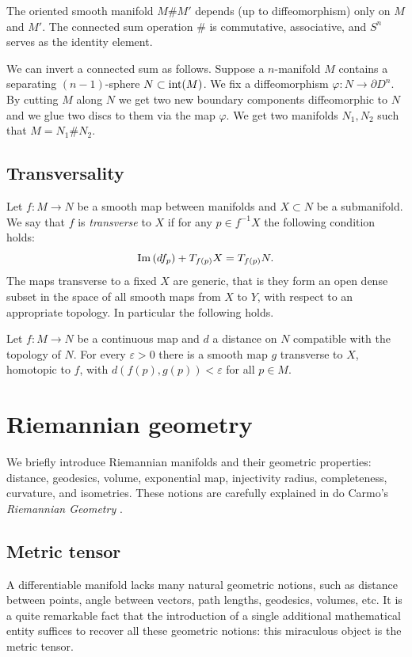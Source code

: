 \begin{prop}
The oriented smooth manifold $M\# M'$ depends (up to diffeomorphism) only on $M$ and $M'$. The connected sum operation $\#$ is commutative, associative, and $S^n$ serves as the identity element.
\end{prop}

We can invert a connected sum as follows. Suppose a $n$-manifold $M$ contains a separating $(n-1)$-sphere $N\subset {\rm int}(M)$. We fix a diffeomorphism $\varphi\colon N \to \partial D^n$. By cutting $M$ along $N$ we get two new boundary components diffeomorphic to $N$ and we glue two discs to them via the map $\varphi$. We get two manifolds $N_1, N_2$ such that $M=N_1\# N_2$.

\subsection{Transversality}
Let $f\colon M \to N$ be a smooth map between manifolds and $X\subset N$ be a submanifold. We say that $f$ is \emph{transverse} to $X$ if for any $p\in f^{-1}X$ the following condition holds:
$${\rm Im\,} (d f_p) + T_{f(p)}X = T_{f(p)}N.$$
The maps transverse to a fixed $X$ are generic, that is they form an open dense subset in the space of all smooth maps from $X$ to $Y$, with respect to an appropriate topology. In particular the following holds.
\begin{teo}
Let $f\colon M \to N$ be a continuous map and $d$ a distance on $N$ compatible with the topology of $N$. For every $\varepsilon >0$ there is a smooth map $g$ transverse to $X$, homotopic to $f$, with $d(f(p), g(p))<\varepsilon$ for all $p\in M$.
\end{teo}

\section{Riemannian geometry}

We briefly introduce Riemannian manifolds and their geometric properties: distance, geodesics, volume, exponential map, injectivity radius, completeness, curvature, and isometries. These notions are carefully explained in do Carmo's \emph{Riemannian Geometry} \cite{Do}.

\subsection{Metric tensor}
A differentiable manifold lacks many natural geometric notions, such as distance between points, angle between vectors, path lengths, geodesics, volumes, etc. It is a quite remarkable fact that the introduction of a single additional mathematical entity suffices to recover all these geometric notions: this miraculous object is the metric tensor.

